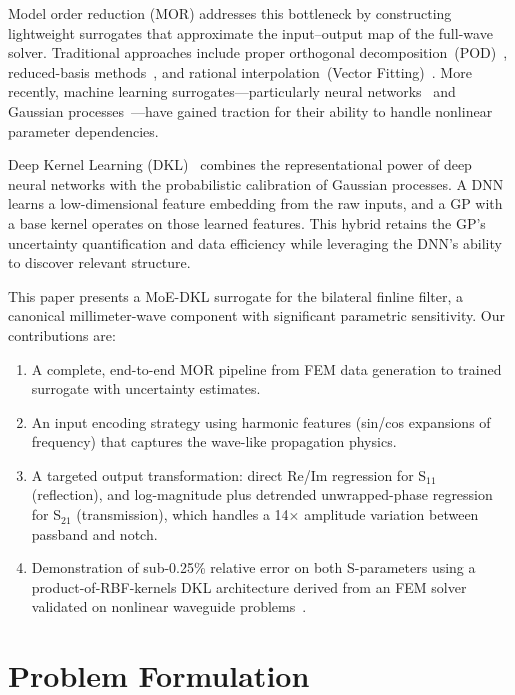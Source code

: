\documentclass[conference]{IEEEtran}
\begin{document}
Model order reduction (MOR) addresses this bottleneck by constructing lightweight surrogates that approximate the input--output map of the full-wave solver. Traditional approaches include proper orthogonal decomposition~(POD)~\cite{quarteroni2015reduced}, reduced-basis methods~\cite{rozza2008efficient}, and rational interpolation~(Vector Fitting)~\cite{gustavsen1999rational}. More recently, machine learning surrogates---particularly neural networks~\cite{burrascano1998learning, feng2018neural} and Gaussian processes~\cite{swiler2011gaussian}---have gained traction for their ability to handle nonlinear parameter dependencies.

Deep Kernel Learning (DKL)~\cite{wilson2016deep} combines the representational power of deep neural networks with the probabilistic calibration of Gaussian processes. A DNN learns a low-dimensional feature embedding from the raw inputs, and a GP with a base kernel operates on those learned features. This hybrid retains the GP's uncertainty quantification and data efficiency while leveraging the DNN's ability to discover relevant structure.

This paper presents a MoE-DKL surrogate for the bilateral finline filter, a canonical millimeter-wave component with significant parametric sensitivity. Our contributions are:
\begin{enumerate}
    \item A complete, end-to-end MOR pipeline from FEM data generation to trained surrogate with uncertainty estimates.
    \item An input encoding strategy using harmonic features (sin/cos expansions of frequency) that captures the wave-like propagation physics.
    \item A targeted output transformation: direct Re/Im regression for S$_{11}$ (reflection), and log-magnitude plus detrended unwrapped-phase regression for S$_{21}$ (transmission), which handles a 14$\times$ amplitude variation between passband and notch.
    \item Demonstration of sub-0.25\% relative error on both S-parameters using a product-of-RBF-kernels DKL architecture derived from an FEM solver validated on nonlinear waveguide problems~\cite{ntibarikure2012}.
\end{enumerate}

\section{Problem Formulation}
\end{document}
